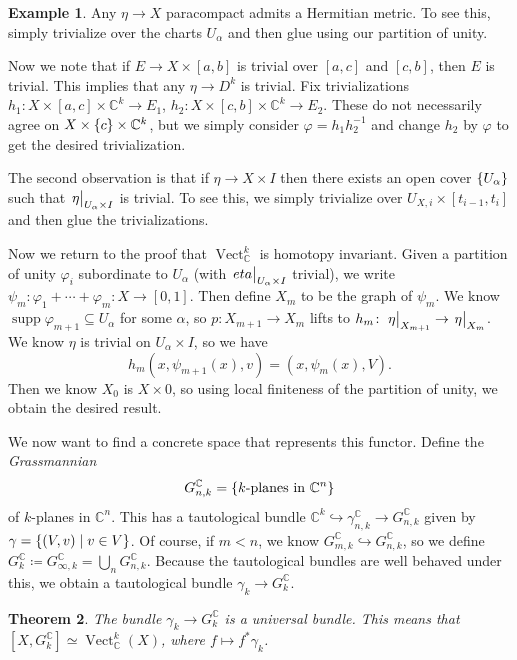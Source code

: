 \documentclass[leqno, openany]{memoir}
\newtheorem{thm}{Theorem}[section]
\theoremstyle{definition}
\newtheorem{exm}[thm]{Example}
\theoremstyle{remark}
\theoremstyle{plain}
\theoremstyle{definition}
\theoremstyle{remark}
\newcommand{\C}{\mathbb{C}}
\DeclareMathOperator{\Vect}{Vect}
\begin{document}
\begin{exm}
    Any $\eta \to X$ paracompact admits a Hermitian metric. To see this, simply trivialize over the charts $U_{\alpha}$ and then glue using our partition of unity.
\end{exm}

Now we note that if $E \to X \times [a,b]$ is trivial over $[a,c]$ and $[c,b]$, then $E$ is trivial. This implies that any $\eta \to D^k$ is trivial. Fix trivializations $h_1 \colon X \times [a,c] \times \C^k \to E_1$, $h_2 \colon X \times [c,b] \times \C^k \to E_2$. These do not necessarily agree on $X \times \qty{c} \times \C^k$, but we simply consider $\varphi = h_1 h_2^{-1}$ and change $h_2$ by $\varphi$ to get the desired trivialization.

The second observation is that if $\eta \to X \times I$ then there exists an open cover $\qty{U_{\alpha}}$ such that $\eval{\eta}_{U_{\alpha} \times I}$ is trivial. To see this, we simply trivialize over $U_{X,i} \times [t_{i-1}, t_i]$ and then glue the trivializations.

Now we return to the proof that $\Vect_{\C}^k$ is homotopy invariant. Given a partition of unity $\varphi_i$ subordinate to $U_{\alpha}$ (with $\eval{eta}_{U_{\alpha} \times I}$ trivial), we write $\psi_m \colon \varphi_1 + \cdots + \varphi_m \colon X \to [0,1]$. Then define $X_m$ to be the graph of $\psi_m$. We know $\operatorname{supp} \varphi_{m+1} \subseteq U_{\alpha}$ for some $\alpha$, so $p \colon X_{m+1} \to X_m$ lifts to $h_m \colon \eval{\eta}_{X_{m+1}} \to \eval{\eta}_{X_m}$. We know $\eta$ is trivial on $U_{\alpha} \times I$, so we have
\[ h_m(x, \psi_{m+1}(x), v) = (x, \psi_m(x), V). \]
Then we know $X_0$ is $X \times \qty{0}$, so using local finiteness of the partition of unity, we obtain the desired result.

We now want to find a concrete space that represents this functor. Define the \textit{Grassmannian}
\[ G_{n, k}^{\C} = \qty{k\text{-planes in }\C^n} \]
of $k$-planes in $\C^n$. This has a tautological bundle $\C^k \hookrightarrow \gamma_{n, k}^{\C} \to G_{n,k}^{\C}$ given by $\gamma = \qty{(V, v) \mid v \in V}$. Of course, if $m < n$, we know $G_{m,k}^{\C} \hookrightarrow G_{n,k}^{\C}$, so we define $G_k^{\C} \coloneqq G_{\infty,k}^{\C} = \bigcup_n G_{n,k}^{\C}$. Because the tautological bundles are well behaved under this, we obtain a tautological bundle $\gamma_k \to G_k^{\C}$.

\begin{thm}
    The bundle $\gamma_k \to G_k^{\C}$ is a universal bundle. This means that $[X, G_k^{\C}] \simeq \Vect_{\C}^k(X)$, where $f \mapsto f^* \gamma_k$.
\end{thm}
\end{document}
